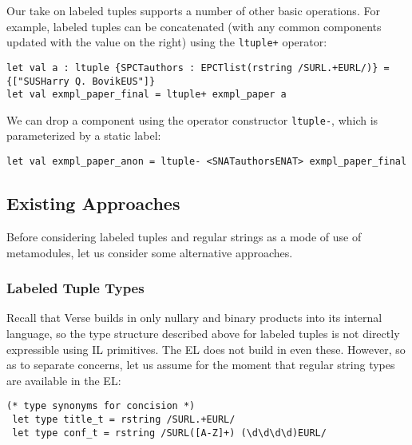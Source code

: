 Our take on labeled tuples supports a number of other basic operations. For example, labeled tuples can be concatenated (with any common components updated with the value on the right) using the \lstinline{ltuple+} operator:
\begin{lstlisting}[numbers=none]
let val a : ltuple {SPCTauthors : EPCTlist(rstring /SURL.+EURL/)} = {["SUSHarry Q. BovikEUS"]}
let val exmpl_paper_final = ltuple+ exmpl_paper a
\end{lstlisting}
We can drop a component using the operator constructor \lstinline{ltuple-}, which is parameterized by a static label:
\begin{lstlisting}[numbers=none]
let val exmpl_paper_anon = ltuple- <SNATauthorsENAT> exmpl_paper_final
\end{lstlisting}

\subsection{Existing Approaches}\label{sec:metamodules-related}
Before considering labeled tuples and regular strings as a mode of use of metamodules, let us consider some alternative approaches.

\subsubsection{Labeled Tuple Types}
Recall that Verse builds in only nullary and binary products into its internal language, so the type structure described above for labeled tuples  is not directly expressible using IL primitives. The EL does not build in even these. However, so as to separate concerns, let us assume for the moment that regular string types are available in the EL: %
\begin{lstlisting}[numbers=none]
 (* type synonyms for concision *)
 let type title_t = rstring /SURL.+EURL/
 let type conf_t = rstring /SURL([A-Z]+) (\d\d\d\d)EURL/
\end{lstlisting}

